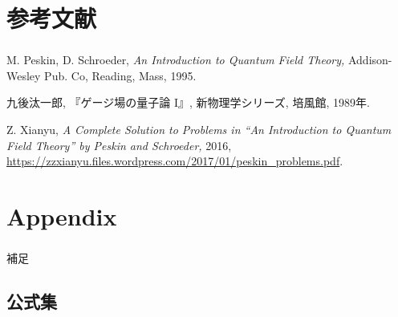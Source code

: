 \documentclass[pdflatex,unicode,ja=standard,12pt]{beamer}
\begin{document}
\section{参考文献}

\begin{frame}[noframenumbering]

  \frametitle{\secname}
  \thispagestyle{empty}

  \beamertemplatetextbibitems

  \begin{thebibliography}{99}

    M. Peskin, D. Schroeder, \textit{An Introduction to Quantum Field Theory,} Addison-Wesley Pub. Co, Reading, Mass, 1995.

    九後汰一郎, 『ゲージ場の量子論 I』, 新物理学シリーズ, 培風館, 1989年.

    Z. Xianyu, \textit{A Complete Solution to Problems in “An Introduction to Quantum Field Theory” by Peskin and Schroeder,} 2016, \url{https://zzxianyu.files.wordpress.com/2017/01/peskin_problems.pdf}.

  \end{thebibliography}

\end{frame}


\section{Appendix}

\begin{frame}[noframenumbering]

  \frametitle{\secname}
  \thispagestyle{empty}

  補足

\end{frame}

\subsection{公式集}
\label{append_1}
\end{document}

